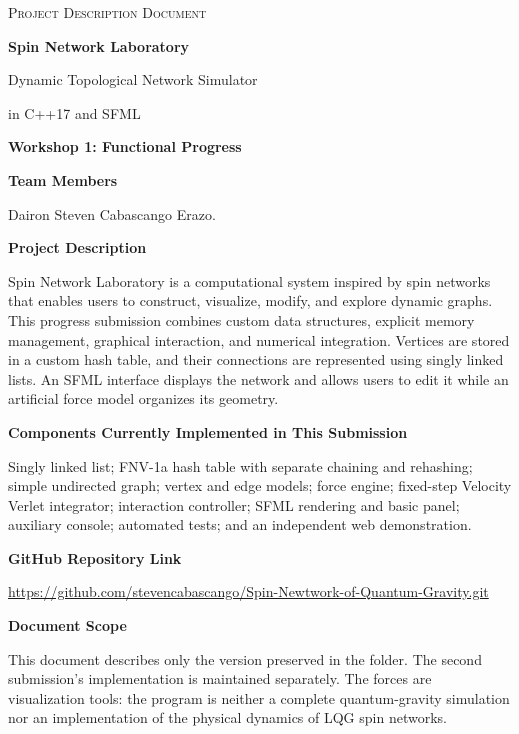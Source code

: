 \documentclass[11pt,a4paper]{article}
\newcommand{\file}[1]{\texttt{\detokenize{#1}}}
\begin{document}
\begin{center}
{\small\scshape Project Description Document}\par
\vspace{1.2cm}
{\Huge\bfseries Spin Network Laboratory}\par
\vspace{0.45cm}
{\Large Dynamic Topological Network Simulator\par in C++17 and SFML}\par
\vspace{0.8cm}
{\large\bfseries Workshop 1: Functional Progress}\par
\vspace{0.8cm}
\end{center}
\textbf{Team Members}\par
Dairon Steven Cabascango Erazo.

\textbf{Project Description}\par
Spin Network Laboratory is a computational system inspired by spin networks that enables users to construct, visualize, modify, and explore dynamic graphs. This progress submission combines custom data structures, explicit memory management, graphical interaction, and numerical integration. Vertices are stored in a custom hash table, and their connections are represented using singly linked lists. An SFML interface displays the network and allows users to edit it while an artificial force model organizes its geometry.

\textbf{Components Currently Implemented in This Submission}\par
Singly linked list; FNV-1a hash table with separate chaining and rehashing; simple undirected graph; vertex and edge models; force engine; fixed-step Velocity Verlet integrator; interaction controller; SFML rendering and basic panel; auxiliary console; automated tests; and an independent web demonstration.

\textbf{GitHub Repository Link}\par
\url{https://github.com/stevencabascango/Spin-Newtwork-of-Quantum-Gravity.git}

\textbf{Document Scope}\par
This document describes only the version preserved in the \file{Workshop 1} folder. The second submission's implementation is maintained separately. The forces are visualization tools: the program is neither a complete quantum-gravity simulation nor an implementation of the physical dynamics of LQG spin networks.
\end{document}
